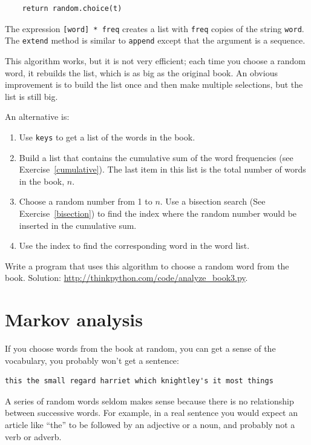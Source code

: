 \documentclass[10pt]{book}
\begin{document}
\begin{CJK}{UTF8}{gbsn}
\begin{verbatim}
    return random.choice(t)
\end{verbatim}
%
The expression {\tt [word] * freq} creates a list with {\tt freq}
copies of the string {\tt word}.  The {\tt extend}
method is similar to {\tt append} except that the argument is
a sequence.

\begin{exercise}
\label{randhist}

This algorithm works, but it is not very efficient; each time you
choose a random word, it rebuilds the list, which is as big as
the original book.  An obvious improvement is to build the list
once and then make multiple selections, but the list is still big.

An alternative is:

\begin{enumerate}

\item Use {\tt keys} to get a list of the words in the book.

\item Build a list that contains the cumulative sum of the word
  frequencies (see Exercise~\ref{cumulative}).  The last item
  in this list is the total number of words in the book, $n$.
  
\item Choose a random number from 1 to $n$.  Use a bisection search
  (See Exercise~\ref{bisection}) to find the index where the random
  number would be inserted in the cumulative sum.

\item Use the index to find the corresponding word in the word list.

\end{enumerate}

Write a program that uses this algorithm to choose a random
word from the book.  Solution: \url{http://thinkpython.com/code/analyze_book3.py}.

\end{exercise}



\section{Markov analysis}
\label{markov}

If you choose words from the book at random, you can get a
sense of the vocabulary, you probably won't get a sentence:

\begin{verbatim}
this the small regard harriet which knightley's it most things
\end{verbatim}
%
A series of random words seldom makes sense because there
is no relationship between successive words.  For example, in
a real sentence you would expect an article like ``the'' to
be followed by an adjective or a noun, and probably not a verb
or adverb.


\end{CJK}
\end{document}
